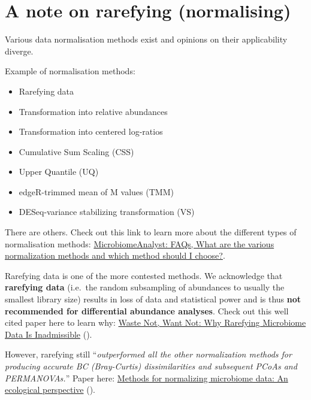 \documentclass[
]{book}
\providecommand{\tightlist}{%
  \setlength{\itemsep}{0pt}\setlength{\parskip}{0pt}}
\begin{document}
\hypertarget{a-note-on-rarefying-normalising}{%
\section{A note on rarefying (normalising)}\label{a-note-on-rarefying-normalising}}

Various data normalisation methods exist and opinions on their applicability diverge.

Example of normalisation methods:

\begin{itemize}
\tightlist
\item
  Rarefying data\\
\item
  Transformation into relative abundances
\item
  Transformation into centered log-ratios
\item
  Cumulative Sum Scaling (CSS)\\
\item
  Upper Quantile (UQ)\\
\item
  edgeR-trimmed mean of M values (TMM)\\
\item
  DESeq-variance stabilizing transformation (VS)
\end{itemize}

There are others. Check out this link to learn more about the different types of normalisation methods: \href{https://www.omicsforum.ca/t/what-are-the-various-normalization-methods-and-which-method-should-i-choose/494}{MicrobiomeAnalyst: FAQs, What are the various normalization methods and which method should I choose?}.

Rarefying data is one of the more contested methods. We acknowledge that \textbf{rarefying data} (i.e.~the random subsampling of abundances to usually the smallest library size) results in loss of data and statistical power and is thus \textbf{not recommended for differential abundance analyses}. Check out this well cited paper here to learn why: \href{https://journals.plos.org/ploscompbiol/article?id=10.1371/journal.pcbi.1003531}{Waste Not, Want Not: Why Rarefying Microbiome Data Is Inadmissible} (\citet{McMurdie2014}).

However, rarefying still ``\emph{outperformed all the other normalization methods for producing accurate BC (Bray-Curtis) dissimilarities and subsequent PCoAs and PERMANOVAs.}'' Paper here: \href{https://doi.org/10.1111/2041-210X.13115}{Methods for normalizing microbiome data: An ecological perspective} (\citet{McKnight2019a}).
\end{document}
